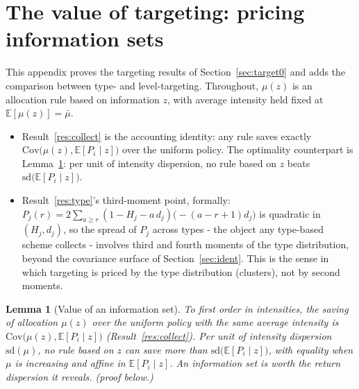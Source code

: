 \documentclass[11pt]{article}
\newtheorem{lemma}{Lemma}
\theoremstyle{remark}
\newcommand{\E}{\mathbb{E}}
\newcommand{\Cov}{\mathrm{Cov}}
\begin{document}
\section{The value of targeting: pricing information sets}\label{sec:targeting}\label{app:target}

This appendix proves the targeting results of Section~\ref{sec:target0} and adds the comparison between type- and level-targeting.
Throughout, $\mu(z)$ is an allocation rule based on information $z$, with average intensity held fixed at $\E[\mu(z)]=\bar\mu$.

\begin{itemize}
\item Result~\ref{res:collect} is the accounting identity: any rule saves exactly $\Cov\bigl(\mu(z),\E[P_i\mid z]\bigr)$ over the uniform policy.
The optimality counterpart is Lemma~\ref{lem:info}: per unit of intensity dispersion, no rule based on $z$ beats $\mathrm{sd}\bigl(\E[P_i\mid z]\bigr)$.
\item Result~\ref{res:type}'s third-moment point, formally: $P_j(r)=2\sum_{a\ge r}(1-H_j-a\,d_j)\bigl(-(a-r+1)d_j\bigr)$ is quadratic in $(H_j,d_j)$, so the spread of $P_j$ across types - the object any type-based scheme collects - involves third and fourth moments of the type distribution, beyond the covariance surface of Section~\ref{sec:ident}.
This is the sense in which targeting is priced by the type distribution (clusters), not by second moments.
\end{itemize}

\begin{lemma}[Value of an information set]\label{lem:info}
To first order in intensities, the saving of allocation $\mu(z)$ over the uniform policy with the same average intensity is $\Cov\bigl(\mu(z),\E[P_i\mid z]\bigr)$ (Result~\ref{res:collect}).
Per unit of intensity dispersion $\mathrm{sd}(\mu)$, no rule based on $z$ can save more than $\mathrm{sd}\bigl(\E[P_i\mid z]\bigr)$, with equality when $\mu$ is increasing and affine in $\E[P_i\mid z]$.
An information set is worth the return dispersion it reveals. (proof below.)
\end{lemma}
\end{document}
